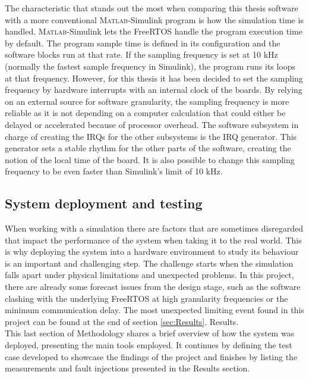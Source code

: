 \documentclass[table,xcdraw]{article}
\begin{document}
The characteristic that stands out the most when comparing this thesis software with a more conventional \textsc{Matlab}-Simulink program is how the simulation time is handled. \textsc{Matlab}-Simulink lets the FreeRTOS handle the program execution time by default. The program sample time is defined in its configuration and the software blocks run at that rate. If the sampling frequency is set at 10 kHz (normally the fastest sample frequency in Simulink), the program runs its loops at that frequency. However, for this thesis it has been decided to set the sampling frequency by hardware interrupts with an internal clock of the boards. By relying on an external source for software granularity, the sampling frequency is more reliable as it is not depending on a computer calculation that could either be delayed or accelerated because of processor overhead. The software subsystem in charge of creating the IRQs for the other subsystems is the IRQ generator. This generator sets a stable rhythm for the other parts of the software, creating the notion of the local time of the board. It is also possible to change this sampling frequency to be even faster than Simulink's limit of 10 kHz.\\




\subsection{System deployment and testing}
When working with a simulation there are factors that are sometimes disregarded that impact the performance of the system when taking it to the real world. This is why deploying the system into a hardware environment to study its behaviour is an important and challenging step. The challenge starts when the simulation falls apart under physical limitations and unexpected problems. In this project, there are already some forecast issues from the design stage, such as the software clashing with the underlying FreeRTOS at high granularity frequencies or the minimum communication delay. The most unexpected limiting event found in this project can be found at the end of section \ref{sec:Results}. Results.\\

This last section of Methodology shares a brief overview of how the system was deployed, presenting the main tools employed. It continues by defining the test case developed to showcase the findings of the project and finishes by listing the measurements and fault injections presented in the Results section.\\
\end{document}
